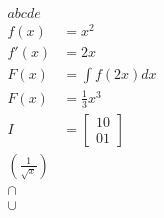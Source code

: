 \documentclass{article}
\begin{document}
        \begin{align}
                abcde\\
                f(x) &= x^2\\
                f'(x) &= 2x\\
                F(x) &= \int f(2x)dx\\
                F(x) &= \frac{1}{3}x^3\\
                I &=    \begin{bmatrix}
                                1 0\\
                                0 1
                        \end{bmatrix}\\
                \left(\frac{1}{\sqrt{x}}\right)\\
                \cap\\
                \cup
        \end{align}
\end{document}
